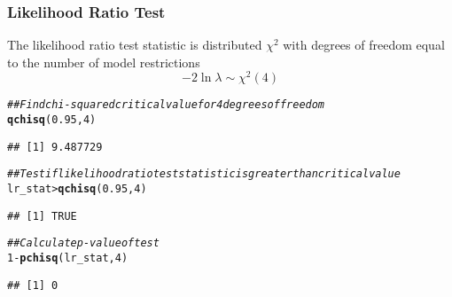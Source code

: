 \documentclass{beamer}\usepackage[]{graphicx}\usepackage[]{xcolor}
\makeatletter
\newcommand{\hlnum}[1]{\textcolor[rgb]{0.686,0.059,0.569}{#1}}%
\newcommand{\hlcom}[1]{\textcolor[rgb]{0.678,0.584,0.686}{\textit{#1}}}%
\newcommand{\hlopt}[1]{\textcolor[rgb]{0,0,0}{#1}}%
\newcommand{\hlstd}[1]{\textcolor[rgb]{0.345,0.345,0.345}{#1}}%
\newcommand{\hlkwd}[1]{\textcolor[rgb]{0.737,0.353,0.396}{\textbf{#1}}}%
\newenvironment{kframe}{%
 \def\at@end@of@kframe{}%
 \ifinner\ifhmode%
  \def\at@end@of@kframe{\end{minipage}}%
  \begin{minipage}{\columnwidth}%
 \fi\fi%
 \def\FrameCommand##1{\hskip\@totalleftmargin \hskip-\fboxsep
 \colorbox{shadecolor}{##1}\hskip-\fboxsep
     \hskip-\linewidth \hskip-\@totalleftmargin \hskip\columnwidth}%
 \MakeFramed {\advance\hsize-\width
   \@totalleftmargin\z@ \linewidth\hsize
   \@setminipage}}%
 {\par\unskip\endMakeFramed%
 \at@end@of@kframe}
\newenvironment{knitrout}{}{} %
\makeatother
\begin{document}
\begin{frame}[fragile]\frametitle{Likelihood Ratio Test}
	  The likelihood ratio test statistic is distributed $\chi^2$ with degrees of freedom equal to the number of model restrictions
    $$-2 \ln \lambda \sim \chi^2(4)$$
\begin{knitrout}\footnotesize
{}\color{fgcolor}\begin{kframe}
\begin{alltt}
\hlcom{## Find chi-squared critical value for 4 degrees of freedom}
\hlkwd{qchisq}\hlstd{(}\hlnum{0.95}\hlstd{,} \hlnum{4}\hlstd{)}
\end{alltt}
\begin{verbatim}
## [1] 9.487729
\end{verbatim}
\begin{alltt}
\hlcom{## Test if likelihood ratio test statistic is greater than critical value}
\hlstd{lr_stat} \hlopt{>} \hlkwd{qchisq}\hlstd{(}\hlnum{0.95}\hlstd{,} \hlnum{4}\hlstd{)}
\end{alltt}
\begin{verbatim}
## [1] TRUE
\end{verbatim}
\begin{alltt}
\hlcom{## Calculate p-value of test}
\hlnum{1} \hlopt{-} \hlkwd{pchisq}\hlstd{(lr_stat,} \hlnum{4}\hlstd{)}
\end{alltt}
\begin{verbatim}
## [1] 0
\end{verbatim}
\end{kframe}
\end{knitrout}
\end{frame}
\end{document}
